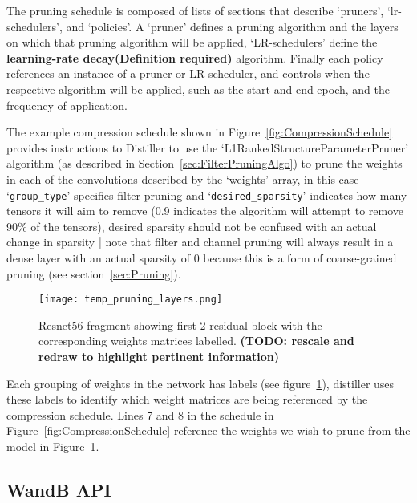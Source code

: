 \documentclass[../Dissertation.tex]{subfiles}
\begin{document}
The pruning schedule is composed of lists of sections that describe `{\color{mintedgreen}pruners}', `{\color{mintedgreen}lr-schedulers}', and `{\color{mintedgreen}policies}'. 
A `{\color{mintedgreen}pruner}' defines a pruning algorithm and the layers on which that pruning algorithm will be applied, `LR-schedulers' define the \textbf{learning-rate decay(Definition required)} algorithm. 
Finally each policy references an instance of a pruner or LR-scheduler, and controls when the respective algorithm will be applied, such as the start and end epoch, and the frequency of application.

The example compression schedule shown in Figure~\ref{fig:CompressionSchedule} provides instructions to Distiller to use the `L1RankedStructureParameterPruner' algorithm (as described in Section~\ref{sec:FilterPruningAlgo}) to prune the weights in each of the convolutions described by the `weights' array, in this case `\texttt{\color{mintedgreen}group\_type}' specifies filter pruning and `\texttt{\color{mintedgreen}desired\_sparsity}' indicates how many tensors it will aim to remove (0.9 indicates the algorithm will attempt to remove 90\% of the tensors), desired sparsity should not be confused with an actual change in sparsity | note that filter and channel pruning will always result in a dense layer with an actual sparsity of 0 because this is a form of coarse-grained pruning (see section~\ref{sec:Pruning}).

\begin{figure}[H]
    \texttt{[image: temp\_pruning\_layers.png]}
    \caption{Resnet56 fragment showing first 2 residual block with the corresponding weights matrices labelled. \textbf{(TODO: rescale and redraw to highlight pertinent information)}}
    \label{fig:resnet56weightlabels}
\end{figure}

Each grouping of weights in the network has labels (see figure~\ref{fig:resnet56weightlabels}), distiller uses these labels to identify which weight matrices are being referenced by the compression schedule. 
Lines 7 and 8 in the schedule in Figure~\ref{fig:CompressionSchedule} reference the weights we wish to prune from the model in Figure~\ref{fig:resnet56weightlabels}.


\newpage
\subsection{WandB API}
\end{document}
